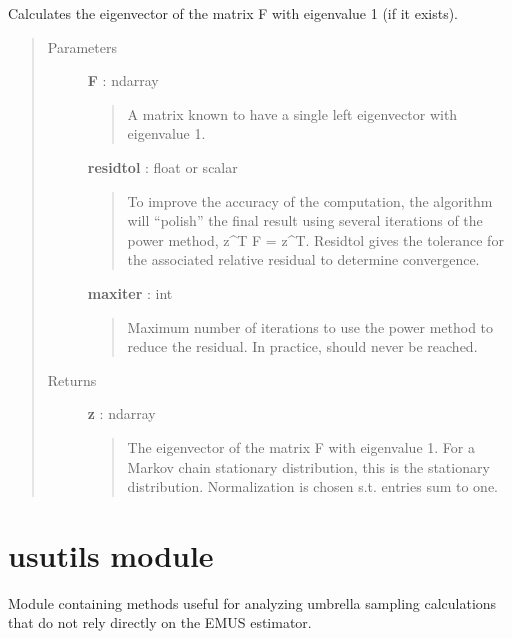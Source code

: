 \documentclass[letterpaper,10pt,english]{sphinxmanual}
\begin{document}
\begin{fulllineitems}
\label{modules/linalg:linalg.stationary_distrib}
Calculates the eigenvector of the matrix F with eigenvalue 1 (if it exists).
\begin{quote}\begin{description}
\item[{Parameters}] \leavevmode
\textbf{F} : ndarray
\begin{quote}

A matrix known to have a single left eigenvector with 
eigenvalue 1.
\end{quote}

\textbf{residtol} : float or scalar
\begin{quote}

To improve the accuracy of the computation, the algorithm will
``polish'' the final result using several iterations of the power
method, z\textasciicircum{}T F = z\textasciicircum{}T.  Residtol gives the tolerance for the 
associated relative residual to determine convergence.
\end{quote}

\textbf{maxiter} : int
\begin{quote}

Maximum number of iterations to use the power method to reduce
the residual.  In practice, should never be reached.
\end{quote}

\item[{Returns}] \leavevmode
\textbf{z} : ndarray
\begin{quote}

The eigenvector of the matrix F with eigenvalue 1.  For a Markov
chain stationary distribution, this is the stationary distribution.
Normalization is chosen s.t. entries sum to one.
\end{quote}

\end{description}\end{quote}

\end{fulllineitems}



\section{usutils module}
\label{modules/usutils:usutils-module}\label{modules/usutils::doc}\label{modules/usutils:module-usutils}
Module containing methods useful for analyzing umbrella sampling 
calculations that do not rely directly on the EMUS estimator.
\end{document}
